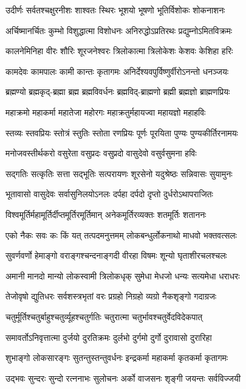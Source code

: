 \twolineshloka
{उदीर्णः सर्वतश्चक्षुरनीशः शाश्वतः स्थिरः}
{भूशयो भूषणो भूतिर्विशोकः शोकनाशनः}

\twolineshloka
{अर्चिष्मानर्चितः कुम्भो विशुद्धात्मा विशोधनः}
{अनिरुद्धोऽप्रतिरथः प्रद्युम्नोऽमितविक्रमः}

\twolineshloka
{कालनेमिनिहा वीरः शौरिः शूरजनेश्वरः}
{त्रिलोकात्मा त्रिलोकेशः केशवः केशिहा हरिः}

\twolineshloka
{कामदेवः कामपालः कामी कान्तः कृतागमः}
{अनिर्देश्यवपुर्विष्णुर्वीरोऽनन्तो धनञ्जयः}

\twolineshloka
{ब्रह्मण्यो ब्रह्मकृद्-ब्रह्मा ब्रह्म ब्रह्मविवर्धनः}
{ब्रह्मविद्-ब्राह्मणो ब्रह्मी ब्रह्मज्ञो ब्राह्मणप्रियः}

\twolineshloka
{महाक्रमो महाकर्मा महातेजा महोरगः}
{महाक्रतुर्महायज्वा महायज्ञो महाहविः}

\twolineshloka
{स्तव्यः स्तवप्रियः स्तोत्रं स्तुतिः स्तोता रणप्रियः}
{पूर्णः पूरयिता पुण्यः पुण्यकीर्तिरनामयः}

\twolineshloka
{मनोजवस्तीर्थकरो वसुरेता वसुप्रदः}
{वसुप्रदो वासुदेवो वसुर्वसुमना हविः}

\twolineshloka
{सद्गतिः सत्कृतिः सत्ता सद्भूतिः सत्परायणः}
{शूरसेनो यदुश्रेष्ठः सन्निवासः सुयामुनः}

\twolineshloka
{भूतावासो वासुदेवः सर्वासुनिलयोऽनलः}
{दर्पहा दर्पदो दृप्तो दुर्धरोऽथापराजितः}

\twolineshloka
{विश्वमूर्तिर्महामूर्तिर्दीप्तमूर्तिरमूर्तिमान्}
{अनेकमूर्तिरव्यक्तः शतमूर्तिः शताननः}

\twolineshloka
{एको नैकः सवः कः किं यत् तत्पदमनुत्तमम्}
{लोकबन्धुर्लोकनाथो माधवो भक्तवत्सलः}

\twolineshloka
{सुवर्णवर्णो हेमाङ्गो वराङ्गश्चन्दनाङ्गदी}
{वीरहा विषमः शून्यो घृताशीरचलश्चलः}

\twolineshloka
{अमानी मानदो मान्यो लोकस्वामी त्रिलोकधृक्}
{सुमेधा मेधजो धन्यः सत्यमेधा धराधरः}

\twolineshloka
{तेजोवृषो द्युतिधरः सर्वशस्त्रभृतां वरः}
{प्रग्रहो निग्रहो व्यग्रो नैकशृङ्गो गदाग्रजः}

\twolineshloka
{चतुर्मूर्तिश्चतुर्बाहुश्चतुर्व्यूहश्चतुर्गतिः}
{चतुरात्मा चतुर्भावश्चतुर्वेदविदेकपात्}

\twolineshloka
{समावर्तोऽनिवृत्तात्मा दुर्जयो दुरतिक्रमः}
{दुर्लभो दुर्गमो दुर्गो दुरावासो दुरारिहा}

\twolineshloka
{शुभाङ्गो लोकसारङ्गः सुतन्तुस्तन्तुवर्धनः}
{इन्द्रकर्मा महाकर्मा कृतकर्मा कृतागमः}

\twolineshloka
{उद्भवः सुन्दरः सुन्दो रत्ननाभः सुलोचनः}
{अर्को वाजसनः शृङ्गी जयन्तः सर्वविज्जयी}

